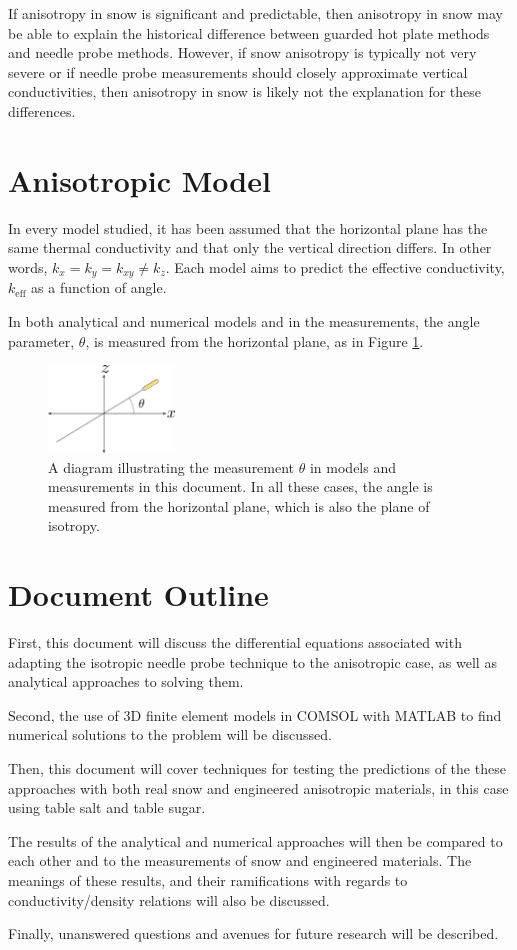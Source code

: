 If anisotropy in snow is significant and predictable, then anisotropy in snow
may be able to explain the historical difference between guarded hot plate
methods and needle probe methods. However, if snow anisotropy is typically
not very severe or if needle probe measurements should closely approximate
vertical conductivities, then anisotropy in snow is likely not the explanation
for these differences.

\section{Anisotropic Model}

In every model studied, it has been assumed that the horizontal plane has the
same thermal conductivity and that only the vertical direction differs. In other
words, \(k_x = k_y = k_{xy} \ne k_z\). Each model aims to predict the effective
conductivity, \(k_{\textrm{eff}}\) as a function of angle.

In both analytical and numerical models and in the measurements, the angle
parameter, \(\theta\), is measured from the horizontal plane, as in Figure 
\ref{fig:angle}.

\begin{figure}[h]
\centering
\includegraphics[width=0.3\textwidth]{fig/angle.png}
\caption{A diagram illustrating the measurement \(\theta\) in models and
measurements in this document. In all these cases, the angle is measured from
the horizontal plane, which is also the plane of isotropy. }
\label{fig:angle}
\end{figure}


\section{Document Outline}

First, this document will discuss the differential equations associated with
adapting the isotropic needle probe technique to the anisotropic case, as well
as analytical approaches to solving them. 

Second, the use of 3D finite element models in COMSOL with MATLAB to find 
numerical solutions to the problem will be discussed.

Then, this document will cover techniques for testing the predictions of the
these approaches with both real snow and engineered anisotropic materials, in
this case using table salt and table sugar.

The results of the analytical and numerical approaches will then be compared to
each other and to the measurements of snow and engineered materials. The meanings
of these results, and their ramifications with regards to conductivity/density
relations will also be discussed.

Finally, unanswered questions and avenues for future research
will be described.
